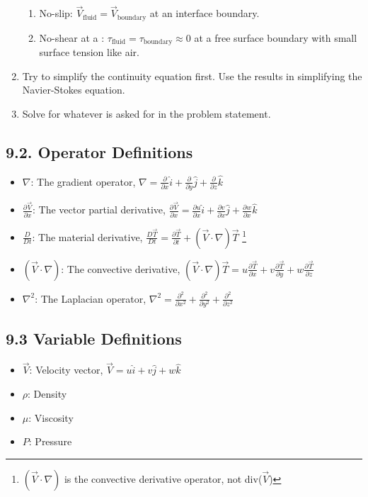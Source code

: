 \documentclass[10pt]{article}
\begin{document}
\begin{multicols*}{2}
\begin{enumerate}
    \begin{enumerate}[label=\roman*)]
        \item No-slip: $\vec{V}_{\text{fluid}} = \vec{V}_{\text{boundary}}$ at an interface boundary.
        \item No-shear at a : $\tau_{\text{fluid}} = \tau_{\text{boundary}} \approx 0$ at a free surface boundary with small surface tension like air.
    \end{enumerate}
    \item Try to simplify the continuity equation first. Use the results in simplifying the Navier-Stokes equation.
    \item Solve for whatever is asked for in the problem statement.
\end{enumerate}

\subsection*{9.2. Operator Definitions}
\begin{itemize}
    \item $\nabla$: The gradient operator, $\nabla = \frac{\partial}{\partial x} \hat{i} + \frac{\partial}{\partial y} \hat{j} + \frac{\partial}{\partial z} \hat{k}$
    \item $\frac{\partial \vec{V}}{\partial x}$: The vector partial derivative, 
    $\frac{\partial \vec{V}}{\partial x} = \frac{\partial u}{\partial x} \hat{i} + \frac{\partial v}{\partial x} \hat{j} + \frac{\partial w}{\partial x} \hat{k}$
    \item $\frac{D}{Dt}$: The material derivative, $\frac{D \vec{T}}{Dt} = \frac{\partial \vec{T}}{\partial t} + (\vec{V} \cdot \nabla) \vec{T}$
    \footnote[1]{$(\vec{V} \cdot \nabla)$ is the convective derivative operator, not div($\vec{V}$)}
    \item $(\vec{V} \cdot \nabla)$: The convective derivative, $(\vec{V} \cdot \nabla) \vec{T} = u \frac{\partial \vec{T}}{\partial x} + v \frac{\partial \vec{T}}{\partial y} + w \frac{\partial \vec{T}}{\partial z}$
    \item $\nabla^2$: The Laplacian operator, $\nabla^2 = \frac{\partial^2}{\partial x^2} + \frac{\partial^2}{\partial y^2} + \frac{\partial^2}{\partial z^2}$
\end{itemize}

\subsection*{9.3 Variable Definitions}
\begin{itemize}
    \item $\vec{V}$: Velocity vector, $\vec{V} = u \hat{i} + v \hat{j} + w \hat{k}$
    \item $\rho$: Density
    \item $\mu$: Viscosity
    \item $P$: Pressure
\end{itemize}


\end{multicols*}
\end{document}
